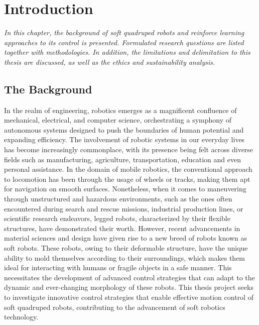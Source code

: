 
\chapter{Introduction}
\label{chap1}
\textit{In this chapter, the background of soft quadruped robots and reinforce learning approaches to its control is presented. Formulated research questions are listed together with methodologies. In addition, the limitations and delimitation to this thesis are discussed, as well as the ethics and sustainability analysis.}

\section{The Background}
In the realm of engineering, robotics emerges as a magnificent confluence of mechanical, electrical, and computer science, orchestrating a symphony of autonomous systems designed to push the boundaries of human potential and expanding efficiency\cite{billardTrendsChallengesRobot2019}. The involvement of robotic systems in our everyday lives has become increasingly commonplace, with its presence being felt across diverse fields such as manufacturing\cite{wangCurrentResearchesFuture2018}, agriculture\cite{liDevelopmentFieldEvaluation2023}, transportation\cite{zhangFindingCriticalScenarios2023}, education\cite{riedoThymioIIRobot2013} and even personal assistance\cite{openaiGPT4TechnicalReport2023}. In the domain of mobile robotics, the conventional approach to locomotion has been through the usage of wheels or tracks, making them apt for navigation on smooth surfaces\cite{liResearchMammalBionic2011}. Nonetheless, when it comes to maneuvering through unstructured and hazardous environments, such as the ones often encountered during search and rescue missions\cite{hawkesSoftRobotThat2017}, industrial production lines\cite{huDesignQuadrupedInspection2021}, or scientific research endeavors\cite{hewingLearningbasedModelPredictive2020}, legged robots, characterized by their flexible structures, have demonstrated their worth. However, recent advancements in material sciences and design have given rise to a new breed of robots known as soft robots. These robots, owing to their deformable structure, have the unique ability to mold themselves according to their surroundings, which makes them ideal for interacting with humans or fragile objects in a safe manner\cite{muralidharanSoftQuadrupedRobot2021}. This necessitates the development of advanced control strategies that can adapt to the dynamic and ever-changing morphology of these robots\cite{wangControlStrategiesSoft2022}. This thesis project seeks to investigate innovative control strategies that enable effective motion control of soft quadruped robots, contributing to the advancement of soft robotics technology.

